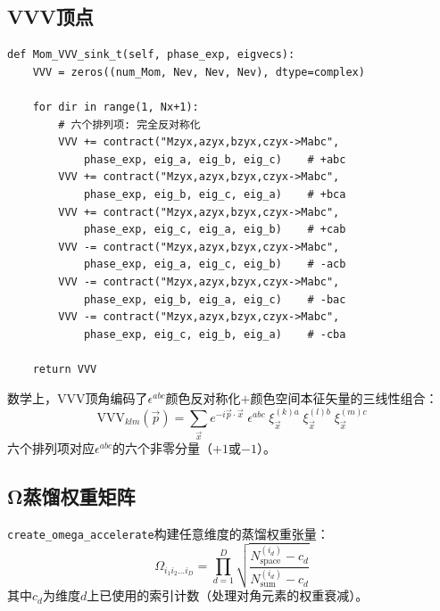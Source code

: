 \documentclass[11pt,a4paper]{ctexart}
\begin{document}
\subsection{VVV顶点}

\begin{codebox}
\begin{lstlisting}[style=python]
def Mom_VVV_sink_t(self, phase_exp, eigvecs):
    VVV = zeros((num_Mom, Nev, Nev, Nev), dtype=complex)

    for dir in range(1, Nx+1):
        # 六个排列项: 完全反对称化
        VVV += contract("Mzyx,azyx,bzyx,czyx->Mabc",
            phase_exp, eig_a, eig_b, eig_c)    # +abc
        VVV += contract("Mzyx,azyx,bzyx,czyx->Mabc",
            phase_exp, eig_b, eig_c, eig_a)    # +bca
        VVV += contract("Mzyx,azyx,bzyx,czyx->Mabc",
            phase_exp, eig_c, eig_a, eig_b)    # +cab
        VVV -= contract("Mzyx,azyx,bzyx,czyx->Mabc",
            phase_exp, eig_a, eig_c, eig_b)    # -acb
        VVV -= contract("Mzyx,azyx,bzyx,czyx->Mabc",
            phase_exp, eig_b, eig_a, eig_c)    # -bac
        VVV -= contract("Mzyx,azyx,bzyx,czyx->Mabc",
            phase_exp, eig_c, eig_b, eig_a)    # -cba

    return VVV
\end{lstlisting}
\end{codebox}

数学上，VVV顶角编码了$\epsilon^{abc}$颜色反对称化$+$颜色空间本征矢量的三线性组合：
\begin{equation}
\mathrm{VVV}_{klm}(\vec{p}) = \sum_{\vec{x}} e^{-i\vec{p}\cdot\vec{x}} \;
\epsilon^{abc} \; \xi^{(k)a}_{\vec{x}} \; \xi^{(l)b}_{\vec{x}} \; \xi^{(m)c}_{\vec{x}}
\end{equation}
六个排列项对应$\epsilon^{abc}$的六个非零分量（$+1$或$-1$）。

\subsection{Ω蒸馏权重矩阵}

\texttt{create\_omega\_accelerate}构建任意维度的蒸馏权重张量：
\begin{equation}
\Omega_{i_1 i_2 \dots i_D} = \prod_{d=1}^{D} \sqrt{ \frac{N_{\mathrm{space}}^{(i_d)} - c_d}{N_{\mathrm{sum}}^{(i_d)} - c_d} }
\end{equation}
其中$c_d$为维度$d$上已使用的索引计数（处理对角元素的权重衰减）。

\end{document}
